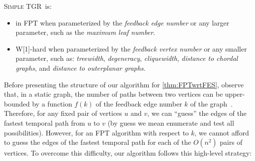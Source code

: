 \documentclass[a4paper,UKenglish,cleveref, autoref, thm-restate, anonymous]{lipics-v2021}
\newcommand{\deltaExact}{\textsc{Simple TGR}}
\begin{document}
\begin{corollary}
\deltaExact\ is:
\begin{itemize}
    \item in FPT when parameterized by the \emph{feedback edge number} or any larger parameter, such as the \emph{maximum leaf number}.
    \item W[1]-hard when parameterized by the \emph{feedback vertex number} or any smaller parameter, such as: 
    \emph{treewidth}, 
    \emph{degeneracy}, 
    \emph{cliquewidth}, 
    \emph{distance to chordal graphs}, and 
    \emph{distance to outerplanar graphs}.
\end{itemize}
\end{corollary}

Before presenting the structure of our algorithm for \cref{thm:FPTwrtFES}, observe that, in a static graph, the number of paths between two vertices can be upper-bounded by a function $f(k)$ of the feedback edge number $k$ of the graph~\cite{casteigts2021finding}. 
Therefore, for any fixed pair of vertices $u$ and $v$, we can ``guess'' the edges of the fastest temporal path from $u$ to $v$ (by guess we mean enumerate and test all possibilities).
However, 
for an FPT algorithm with respect to $k$, we cannot afford to guess the edges of the fastest temporal path for each of the $O(n^2)$ pairs of vertices. 
To overcome this difficulty, our algorithm follows this high-level strategy:
\end{document}
